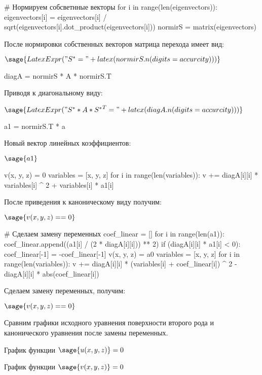 \documentclass[14pt, a4paper]{article}
\begin{document}
\begin{sagesilent}
    # Нормируем собсветнные векторы
for i in range(len(eigenvectors)):
    eigenvectors[i] = eigenvectors[i] / sqrt(eigenvectors[i].dot_product(eigenvectors[i]))
    normirS = matrix(eigenvectors)
\end{sagesilent}

После нормировки собственных векторов матрица перехода имеет вид:

$\sage{LatexExpr("S^* = " + latex(normirS.n(digits = accurcity)))}$

\begin{sagesilent}
    diagA = normirS * A * normirS.T
\end{sagesilent}

Приводя к диагональному виду:

$\sage{LatexExpr("S^{*} * A * {S^{*}}^T = " + latex(diagA.n(digits = accurcity)))}$

\begin{sagesilent}
    a1 = normirS.T * a
\end{sagesilent}

Новый вектор линейных коэффициентов:

$\sage{a1}$

\begin{sagesilent}
    v(x, y, z) = 0
    variables = [x, y, z]
    for i in range(len(variables)):
        v += diagA[i][i] * variables[i] ^ 2 + variables[i] * a1[i]
\end{sagesilent}

После приведения к каноническому виду получим:

$\sage{v(x, y, z) == 0}$

\begin{sagesilent}
    # Сделаем замену переменных
    coef_linear = []
    for i in range(len(a1)):
        coef_linear.append((a1[i] / (2 * diagA[i][i])) ** 2)
        if (diagA[i][i] * a1[i] < 0):
            coef_linear[-1] = -coef_linear[-1]
    v(x, y, z) = a0
    variables = [x, y, z]
    for i in range(len(variables)):
        v += diagA[i][i] * (variables[i] + coef_linear[i]) ^ 2 - diagA[i][i] * abs(coef_linear[i])
\end{sagesilent}

Сделаем замену переменных, получим:

$\sage{v(x, y, z) == 0}$

\pagebreak

Сравним графики исходного уравнения поверхности второго рода и канонического уравнения после замены переменных.

График функции $\sage{u(x, y, z)} = 0$
\begin{center}
\end{center}

График функции $\sage{v(x, y, z)} = 0$
\begin{center}
\end{center}
\end{document}
